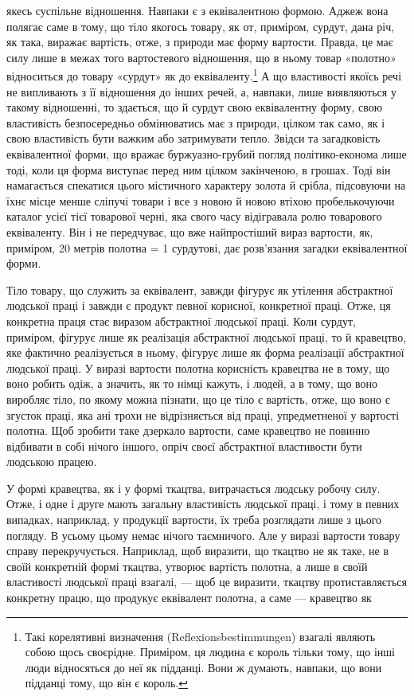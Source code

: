 \parcont{}  %
якесь суспільне відношення. Навпаки є з еквівалентною формою. Аджеж вона полягає саме в тому, що
тіло якогось товару, як от, приміром, сурдут, дана річ, як така, виражає вартість, отже, з природи
має форму вартости. Правда, це має силу лише в межах того вартостевого відношення, що в ньому товар
«полотно» відноситься до товару «сурдут» як до еквіваленту.\footnote{
Такі корелятивні визначення (Reflexionsbestimmungen) взагалі являють собою щось своєрідне.
Приміром, ця людина є король тільки тому, що інші люди відносяться до неї як підданці. Вони ж
думають, навпаки, що вони підданці тому, що він є король.
} А що властивості
якоїсь речі не випливають з її відношення до інших речей, а, навпаки, лише виявляються у такому
відношенні, то здається, що й сурдут свою еквівалентну форму, свою властивість безпосередньо
обмінюватись має з природи, цілком так само, як і свою властивість бути важким або затримувати
тепло. Звідси та загадковість еквівалентної форми, що вражає буржуазно-грубий погляд
політико-економа лише тоді, коли ця форма виступає перед ним цілком закінченою, в грошах. Тоді він
намагається спекатися цього містичного характеру золота й срібла, підсовуючи на їхнє місце менше
сліпучі товари і все з новою й новою втіхою пробелькочуючи каталог усієї тієї товарової черні, яка
свого часу відігравала ролю товарового еквіваленту. Він і не передчуває, що вже найпростіший вираз
вартости, як, приміром, 20 метрів полотна = 1 сурдутові, дає розв’язання загадки еквівалентної
форми.

Тіло товару, що служить за еквівалент, завжди фігурує як утілення абстрактної людської праці і
завжди є продукт певної корисної, конкретної праці. Отже, ця конкретна праця стає виразом
абстрактної людської праці. Коли сурдут, приміром, фігурує лише як реалізація абстрактної людської
праці, то й кравецтво, яке фактично реалізується в ньому, фігурує лише як форма реалізації
абстрактної людської праці. У виразі вартости полотна корисність кравецтва не в тому, що воно робить
одіж, а значить, як то німці кажуть, і людей, а в тому, що воно виробляє тіло, по якому можна
пізнати, що це тіло є вартість, отже, що воно є згусток праці, яка ані трохи не відрізняється від
праці, упредметненої у вартості полотна. Щоб зробити таке дзеркало вартости, саме кравецтво не
повинно відбивати в собі нічого іншого, опріч своєї абстрактної властивости бути людською працею.

У формі кравецтва, як і у формі ткацтва, витрачається людську робочу силу. Отже, і одне і друге
мають загальну властивість людської праці, і тому в певних випадках, наприклад, у продукції
вартости, їх треба розглядати лише з цього погляду. В усьому цьому немає нічого таємничого. Але у
виразі вартости товару справу перекручується. Наприклад, щоб виразити, що ткацтво не як таке, не в
своїй конкретній формі ткацтва, утворює вартість полотна, а лише в своїй властивості людської праці
взагалі, — щоб це виразити, ткацтву протиставляється конкретну працю, що продукує еквівалент
полотна, а саме — кравецтво як
\parbreak{}  %
